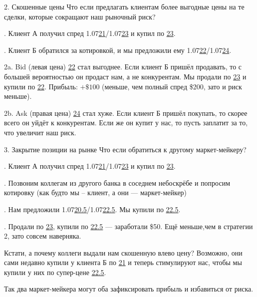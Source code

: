 \documentclass{beamer}
\begin{document}
\begin{frame}{2. Скошенные цены}
\justify
Что если предлагать клиентам более выгодные цены на те сделки, которые сокращают
наш рыночный риск?

. Клиент А получил спред 1.07\underline{21}/1.07\underline{23} и купил по \underline{23}.

. Клиент Б обратился за котировкой, и мы предложили ему 1.07\underline{22}/1.07\underline{24}.

\justify
2a. Bid (левая цена) \underline{22} стал выгоднее. Если клиент Б пришёл 
продавать, то с большей вероятностью он продаст нам, а не конкурентам.
Мы продали по \underline{23} и купили по \underline{22}. Прибыль: $+\$100$ (меньше, чем полный спред \$200, зато и риск меньше).

\justify
2b. Ask (правая цена) \underline{24} стал хуже. Если клиент Б пришёл покупать,
то скорее всего он уйдёт к конкурентам. Если же он купит у нас, то пусть заплатит за то, что увеличит наш риск.
\end{frame}



\begin{frame}{3. Закрытие позиции на рынке}
\justify
Что если обратиться к другому маркет-мейкеру?

. Клиент А получил спред 1.07\underline{21}/1.07\underline{23} и купил по \underline{23}.

. Позвоним коллегам из другого банка в соседнем небоскрёбе и попросим 
котировку (как будто мы -- клиент, а они --- маркет-мейкер)

. Нам предложили 1.07\underline{20.5}/1.07\underline{22.5}. Мы купили по \underline{22.5}.

. Продали по \underline{23}, купили по \underline{22.5} --- заработали \$50. 
Ещё меньше,чем в стратегии 2, зато совсем наверняка.

\justify
Кстати, а почему коллеги выдали нам скошенную влево цену? Возможно, они сами недавно купили у клиента Б по \underline{21} и теперь стимулируют нас, чтобы мы 
купили у них по супер-цене \underline{22.5}.

\justify
Так два маркет-мейкера могут оба зафиксировать прибыль и избавиться от риска.
\end{frame}
\end{document}
